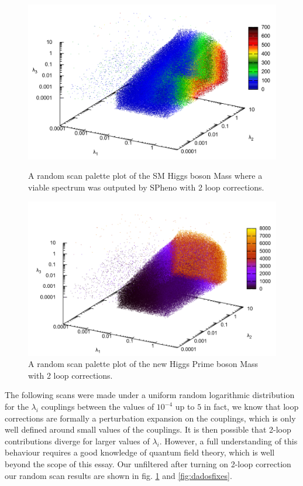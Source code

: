 \documentclass[12pt]{article}
\begin{document}
\begin{figure}[H]
  \includegraphics[width=\linewidth]{h1-random-scan.png}
  \caption{A random scan palette plot of the SM Higgs boson Mass where a viable spectrum was outputed by SPheno with 2 loop corrections.}\label{fig:dadosfixes}
\endminipage\hfill
{}%
  \includegraphics[width=\linewidth]{h2-random-scan.png}
  \caption{A random scan palette plot of the new Higgs Prime boson Mass with 2 loop corrections.}\label{fig:outrosdadosfixes}
\endminipage
\end{figure}
%
%
The following scans were made under a uniform random logarithmic distribution for the $\lambda_i$ couplings between the values of $10^{-4}$ up to $5$ in fact, we know that loop corrections are formally a perturbation expansion on the couplings, which is only well defined around small values of the couplings. It is then possible that 2-loop contributions diverge for larger values of $\lambda_i$. However, a full understanding of this behaviour requires a good knowledge of quantum field theory, which is well beyond the scope of this essay. Our unfiltered after turning on 2-loop correction our random scan results are shown in fig. \ref{fig:outrosdadosfixes} and \ref{fig:dadosfixes}. 
\end{document}
